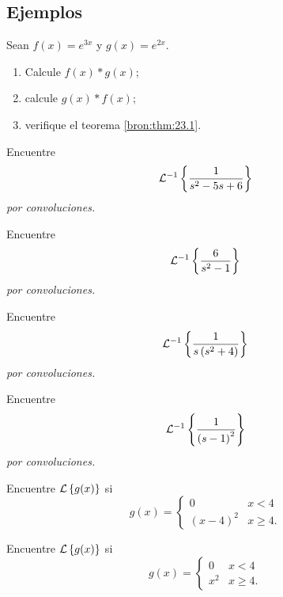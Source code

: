 \subsection{Ejemplos}


	\begin{resuelto}
		\label{bron:exmp:23.1} Sean $f(x)=e^{3x}$ y $g(x)=e^{2x}.$
		\begin{enumerate}
			\item Calcule $f(x) \ast g(x);$
			\item calcule $g(x) \ast f(x);$
			\item verifique el teorema \ref{bron:thm:23.1}.
		\end{enumerate}

	\end{resuelto}




	\begin{resuelto}
		\label{bron:exmp:23.4}
		Encuentre
		$$
		\mathcal{L}^{-1}\left\{ \dfrac{1}{s^{2}-5s+6} \right\}
		$$
		\emph{por convoluciones.}
	\end{resuelto}




	\begin{resuelto}
		\label{bron:exmp:23.5}
		Encuentre
		$$
		\mathcal{L}^{-1}\left\{ \dfrac{6}{s^{2}-1} \right\}
		$$
		\emph{por convoluciones.}
	\end{resuelto}




	\begin{resuelto}
		\label{bron:exmp:23.6}
		Encuentre
		$$
		\mathcal{L}^{-1}\left\{ \dfrac{1}{s\left( s^{2}+4 \right)} \right\}
		$$
		\emph{por convoluciones.}
	\end{resuelto}




	\begin{resuelto}
		\label{bron:exmp:23.7}
		Encuentre
		$$
		\mathcal{L}^{-1}\left\{ \dfrac{1}{\left( s-1 \right)^{2}} \right\}
		$$
		\emph{por convoluciones.}
	\end{resuelto}




	\begin{resuelto}
		\label{bron:exmp:23.13}
		Encuentre $\mathcal{L}\left\{ g(x) \right\}$ si
		$$
		g(x)=\begin{cases}
		0 & x<4\\
		\left( x-4 \right)^{2} & x\geq 4.
		\end{cases}
		$$
	\end{resuelto}




	\begin{resuelto}
		\label{bron:exmp:23.14}
		Encuentre $\mathcal{L}\left\{ g(x) \right\}$ si
		$$
		g(x)=\begin{cases}
		0 & x<4\\
		x^{2} & x\geq 4.
		\end{cases}
		$$
	\end{resuelto}




